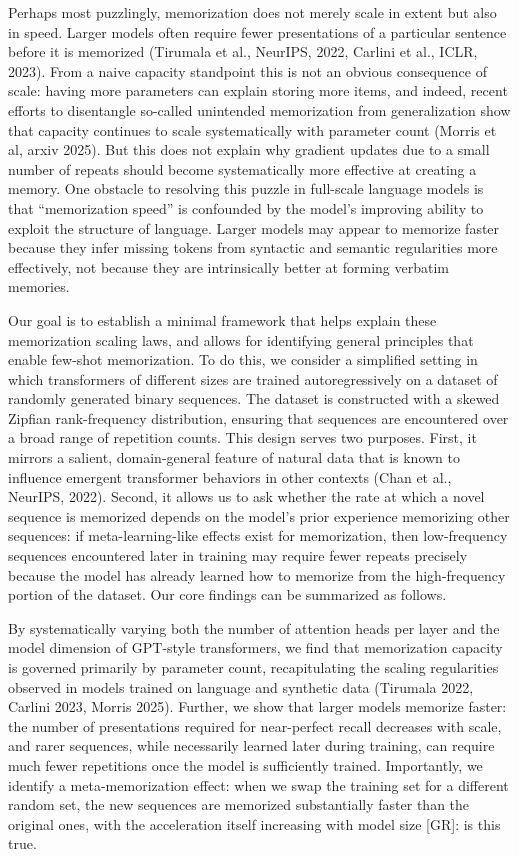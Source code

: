 \documentclass{article}
\theoremstyle{plain}
\theoremstyle{definition}
\theoremstyle{remark}
\newcommand{\gr}[1]{{\color{blue}[GR]: #1}}
\begin{document}
Perhaps most puzzlingly, memorization does not merely scale in extent but also in speed. Larger models often require fewer presentations of a particular sentence before it is memorized (Tirumala et al., NeurIPS, 2022, Carlini et al., ICLR, 2023). From a naive capacity standpoint this is not an obvious consequence of scale: having more parameters can explain storing more items, and indeed, recent efforts to disentangle so-called unintended memorization from generalization show that capacity continues to scale systematically with parameter count (Morris et al, arxiv 2025). But this does not explain why gradient updates due to a small number of repeats should become systematically more effective at creating a memory. One obstacle to resolving this puzzle in full-scale language models is that ``memorization speed'' is confounded by the model’s improving ability to exploit the structure of language. Larger models may appear to memorize faster because they infer missing tokens from syntactic and semantic regularities more effectively, not because they are intrinsically better at forming verbatim memories. 

Our goal is to establish a minimal framework that helps explain these memorization scaling laws, and allows for identifying general principles that enable few-shot memorization. To do this, we consider a simplified setting in which transformers of different sizes are trained autoregressively on a dataset of randomly generated binary sequences. The dataset is constructed with a skewed Zipfian rank-frequency distribution, ensuring that sequences are encountered over a broad range of repetition counts. This design serves two purposes. First, it mirrors a salient, domain-general feature of natural data that is known to influence emergent transformer behaviors in other contexts (Chan et al., NeurIPS, 2022). Second, it allows us to ask whether the rate at which a novel sequence is memorized depends on the model’s prior experience memorizing other sequences: if meta-learning-like effects exist for memorization, then low-frequency sequences encountered later in training may require fewer repeats precisely because the model has already learned how to memorize from the high-frequency portion of the dataset. Our core findings can be summarized as follows. 

By systematically varying both the number of attention heads per layer and the model dimension of GPT-style transformers, we find that memorization capacity is governed primarily by parameter count, recapitulating the scaling regularities observed in models trained on language and synthetic data (Tirumala 2022, Carlini 2023, Morris 2025). Further, we show that larger models memorize faster: the number of presentations required for near-perfect recall decreases with scale, and rarer sequences, while necessarily learned later during training, can require much fewer repetitions once the model is sufficiently trained. Importantly, we identify a meta-memorization effect: when we swap the training set for a different random set, the new sequences are memorized substantially faster than the original ones, with the acceleration itself increasing with model size \gr{is this true}. 
\end{document}
